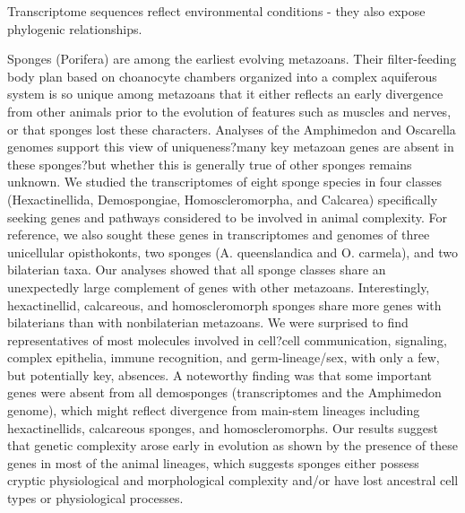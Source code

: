 \documentclass[a4paper, 11pt]{article}
\begin{document}
Transcriptome sequences reflect environmental conditions - they also expose phylogenic relationships. 

Sponges (Porifera) are among the earliest evolving metazoans. Their filter-feeding body plan based on choanocyte chambers organized into a complex aquiferous system is so unique among metazoans that it either reflects an early divergence from other animals prior to the evolution of features such as muscles and nerves, or that sponges lost these characters. Analyses of the Amphimedon and Oscarella genomes support this view of uniqueness?many key metazoan genes are absent in these sponges?but whether this is generally true of other sponges remains unknown. We studied the transcriptomes of eight sponge species in four classes (Hexactinellida, Demospongiae, Homoscleromorpha, and Calcarea) specifically seeking genes and pathways considered to be involved in animal complexity. For reference, we also sought these genes in transcriptomes and genomes of three unicellular opisthokonts, two sponges (A. queenslandica and O. carmela), and two bilaterian taxa. Our analyses showed that all sponge classes share an unexpectedly large complement of genes with other metazoans. Interestingly, hexactinellid, calcareous, and homoscleromorph sponges share more genes with bilaterians than with nonbilaterian metazoans. We were surprised to find representatives of most molecules involved in cell?cell communication, signaling, complex epithelia, immune recognition, and germ-lineage/sex, with only a few, but potentially key, absences. A noteworthy finding was that some important genes were absent from all demosponges (transcriptomes and the Amphimedon genome), which might reflect divergence from main-stem lineages including hexactinellids, calcareous sponges, and homoscleromorphs. Our results suggest that genetic complexity arose early in evolution as shown by the presence of these genes in most of the animal lineages, which suggests sponges either possess cryptic physiological and morphological complexity and/or have lost ancestral cell types or physiological processes.
\end{document}
